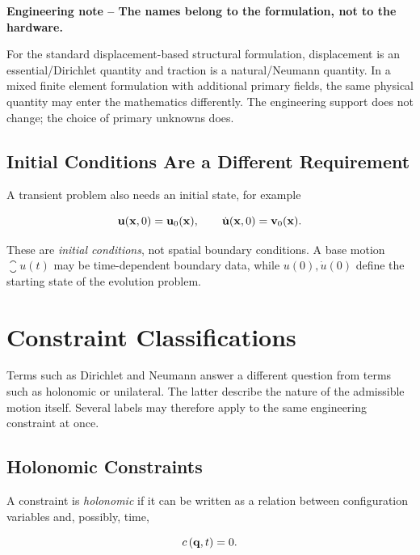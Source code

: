 \begin{bbox}
\textbf{Engineering note -- The names belong to the formulation, not to the
hardware.}

For the standard displacement-based structural formulation, displacement is an
essential/Dirichlet quantity and traction is a natural/Neumann quantity. In a
mixed finite element formulation with additional primary fields, the same
physical quantity may enter the mathematics differently. The engineering
support does not change; the choice of primary unknowns does.
\end{bbox}

\subsection{Initial Conditions Are a Different Requirement}

A transient problem also needs an initial state, for example

\begin{equation}
    \mathbf{u}(\mathbf{x},0)=\mathbf{u}_0(\mathbf{x}),
    \qquad
    \dot{\mathbf{u}}(\mathbf{x},0)=\mathbf{v}_0(\mathbf{x}).
\end{equation}

These are \textit{initial conditions}, not spatial boundary conditions. A base
motion $\closure{u}(t)$ may be time-dependent boundary data, while
$u(0),\dot u(0)$ define the starting state of the evolution problem.

\section{Constraint Classifications}

Terms such as Dirichlet and Neumann answer a different question from terms such
as holonomic or unilateral. The latter describe the nature of the admissible
motion itself. Several labels may therefore apply to the same engineering
constraint at once.

\subsection{Holonomic Constraints}

A constraint is \textit{holonomic} if it can be written as a relation between
configuration variables and, possibly, time,

\begin{equation}\label{eq:holonomic-constraint}
    c\left(\mathbf{q},t\right)=0.
\end{equation}

